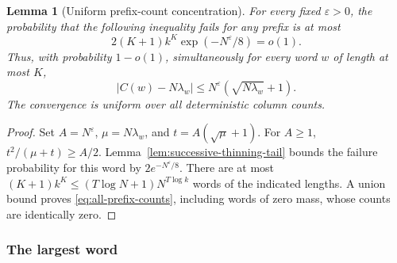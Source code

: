\documentclass[11pt]{article}
\numberwithin{equation}{section}
\newtheorem{lemma}[theorem]{Lemma}
\theoremstyle{definition}
\theoremstyle{remark}
\newcommand{\1}{\mathbf 1}
\begin{document}
\begin{lemma}[Uniform prefix-count concentration]
\label{cor:iterated-hypergeom}
For every fixed $\varepsilon>0$, the probability that the following inequality fails for any prefix is at most
\[
 2(K+1)k^K\exp(-N^\varepsilon/8)=o(1).
\]
Thus, with probability $1-o(1)$,
simultaneously for every word \(w\) of length at most \(K\),
\begin{equation}
\label{eq:all-prefix-counts}
 |C(w)-N\lambda_w|\le
 N^\varepsilon(\sqrt{N\lambda_w}+1).
\end{equation}
The convergence is uniform over all deterministic column counts.
\end{lemma}

\begin{proof}
Set \(A=N^\varepsilon\), \(\mu=N\lambda_w\), and
\(t=A(\sqrt\mu+1)\). For \(A\ge1\),
\(t^2/(\mu+t)\ge A/2\).
Lemma~\ref{lem:successive-thinning-tail} bounds the failure probability
for this word by \(2e^{-N^\varepsilon/8}\).
There are at most \((K+1)k^{K}\le (T\log N+1)N^{T\log k}\)
words of the indicated lengths. A union bound proves
\eqref{eq:all-prefix-counts}, including words of zero mass, whose counts
are identically zero.
\end{proof}

\subsubsection{The largest word}
\end{document}
